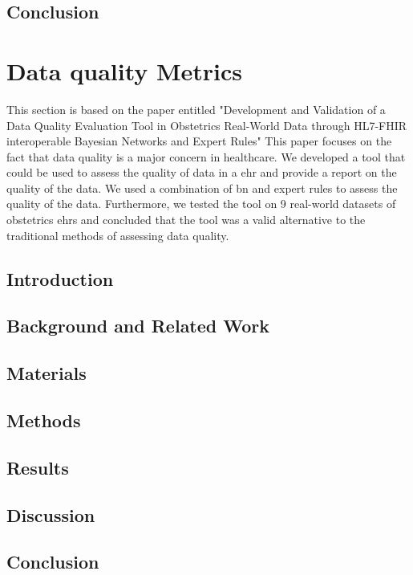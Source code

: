 \subsection{Conclusion}



\section{Data quality Metrics}\label{subsec:dq}
This section is based on the paper entitled "Development and Validation of a Data Quality Evaluation Tool in Obstetrics Real-World Data through HL7-FHIR interoperable Bayesian Networks and Expert Rules" This paper focuses on the fact that data quality is a major concern in healthcare. We developed a tool that could be used to assess the quality of data in a \ac{ehr} and provide a report on the quality of the data. We used a combination of \ac{bn} and expert rules to assess the quality of the data. Furthermore, we tested the tool on 9 real-world datasets of obstetrics \acp{ehr} and concluded that the tool was a valid alternative to the traditional methods of assessing data quality.
%
\subsection{Introduction}

\subsection{Background and Related Work}

\subsection{Materials}

\subsection{Methods}

\subsection{Results}

\subsection{Discussion}

\subsection{Conclusion}





